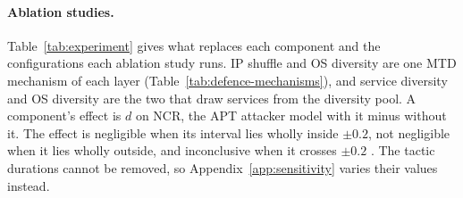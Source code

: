 \documentclass{cshonours}
\begin{document}
\paragraph{Ablation studies.} Table~\ref{tab:experiment} gives what replaces
each component and the configurations each ablation study runs.
IP shuffle and OS diversity are one MTD mechanism of each layer
(Table~\ref{tab:defence-mechanisms}), and service diversity and OS diversity
are the two that draw services from the diversity pool. A component's effect
is $d$ on NCR, the APT attacker model with it minus without it. The effect is
negligible when its interval lies wholly inside $\pm 0.2$, not negligible when
it lies wholly outside, and inconclusive when it crosses $\pm 0.2$
\citep{lakens2018equivalence}.
The tactic durations cannot be removed, so Appendix~\ref{app:sensitivity}
varies their values instead.
\end{document}
